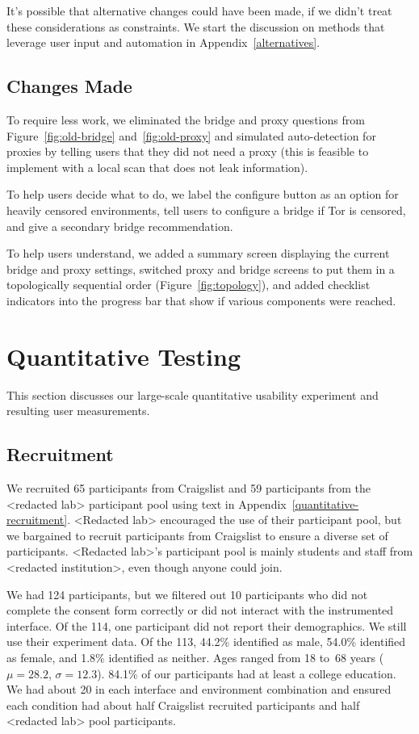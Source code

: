 \documentclass[USenglish,oneside,twocolumn]{article}
\begin{document}
It's possible that alternative changes could have been made, if we didn't treat these considerations as constraints. We start the discussion on methods that leverage user input and automation in Appendix~\ref{alternatives}. 

\subsection{Changes Made} 
To require less work, we eliminated the bridge and proxy questions from Figure~\ref{fig:old-bridge} and~\ref{fig:old-proxy} and simulated auto-detection for proxies by telling users that they did not need a proxy (this is feasible to implement with a local scan that does not leak information). 

To help users decide what to do, we label the configure button as an option for heavily censored environments, tell users to configure a bridge if Tor is censored, and give a secondary bridge recommendation.

To help users understand, we added a summary screen displaying the current bridge and proxy settings, switched proxy and bridge screens to put them in a topologically sequential order (Figure~\ref{fig:topology}), and added checklist indicators into the progress bar that show if various components were reached.

\section{Quantitative Testing}
\label{sec:quantitative}
This section discusses our large-scale quantitative usability experiment and resulting user measurements. 

\subsection{Recruitment}
We recruited 65 participants from Craigslist and 59 participants from the <redacted lab> participant pool using text in Appendix~\ref{quantitative-recruitment}. <Redacted lab> encouraged the use of their participant pool, but we bargained to recruit participants from Craigslist to ensure a diverse set of participants. <Redacted lab>'s participant pool is mainly students and staff from <redacted institution>, even though anyone could join. 

We had 124 participants, but we filtered out 10 participants who did not complete the consent form correctly or did not interact with the instrumented interface. Of the 114, one participant did not report their demographics. We still use their experiment data. Of the 113, 44.2\% identified as male, 54.0\% identified as female, and 1.8\% identified as neither. Ages ranged from 18 to~68 years ($\mu = 28.2$, $\sigma = 12.3$). 84.1\% of our participants had at least a college education. We had about 20 in each interface and environment combination and ensured each condition had about half Craigslist recruited participants and half <redacted lab>  pool participants. 
\end{document}
